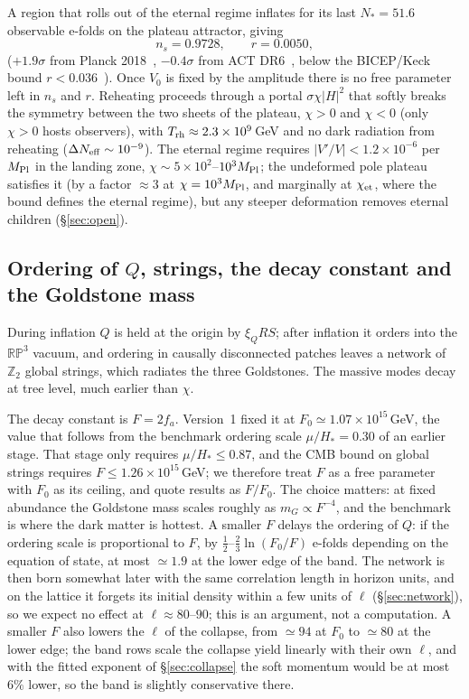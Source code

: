 \documentclass[11pt,a4paper]{article}
\newcommand{\RP}{\mathbb{RP}^3}
\newcommand{\Ztwo}{\mathbb{Z}_2}
\newcommand{\Mpl}{M_{\rm Pl}}
\begin{document}
A region that rolls out of the eternal regime inflates for its last $N_* = 51.6$ observable e-folds on the plateau attractor, giving
\begin{equation}
n_s = 0.9728,\qquad r = 0.0050,
\end{equation}
($+1.9\sigma$ from Planck 2018~\cite{Planck2018X}, $-0.4\sigma$ from ACT DR6~\cite{ACTDR6}, below the BICEP/Keck bound $r<0.036$~\cite{BK18}).
Once $V_0$ is fixed by the amplitude there is no free parameter left in $n_s$ and $r$.
Reheating proceeds through a portal $\sigma\chi|H|^2$ that softly breaks the symmetry between the two sheets of the plateau, $\chi>0$ and $\chi<0$ (only $\chi>0$ hosts observers), with $T_{\rm rh}\approx2.3\times10^{9}$\,GeV and no dark radiation from reheating ($\Delta N_{\rm eff}\sim10^{-9}$).
The eternal regime requires $|V'/V| < 1.2\times10^{-6}$ per $\Mpl$ in the landing zone, $\chi\sim 5\times10^2$--$10^3\Mpl$; the undeformed pole plateau satisfies it (by a factor $\approx3$ at $\chi=10^3\Mpl$, and marginally at $\chi_{\rm et}$, where the bound defines the eternal regime), but any steeper deformation removes eternal children (\S\ref{sec:open}).

\subsection{Ordering of $Q$, strings, the decay constant and the Goldstone mass}
\label{sec:F}

During inflation $Q$ is held at the origin by $\xi_Q R S$; after inflation it orders into the $\RP$ vacuum, and ordering in causally disconnected patches leaves a network of $\Ztwo$ global strings, which radiates the three Goldstones.
The massive modes decay at tree level, much earlier than $\chi$.

The decay constant is $F=2f_a$.
Version~1 fixed it at $F_0\simeq1.07\times10^{15}$\,GeV, the value that follows from the benchmark ordering scale $\mu/H_*=0.30$ of an earlier stage.
That stage only requires $\mu/H_*\le0.87$, and the CMB bound on global strings requires $F\le1.26\times10^{15}$\,GeV; we therefore treat $F$ as a free parameter with $F_0$ as its ceiling, and quote results as $F/F_0$.
The choice matters: at fixed abundance the Goldstone mass scales roughly as $m_G\propto F^{-4}$, and the benchmark is where the dark matter is hottest.
A smaller $F$ delays the ordering of $Q$: if the ordering scale is proportional to $F$, by $\tfrac12$--$\tfrac23\ln(F_0/F)$ e-folds depending on the equation of state, at most $\simeq1.9$ at the lower edge of the band. The network is then born somewhat later with the same correlation length in horizon units, and on the lattice it forgets its initial density within a few units of $\ell$ (\S\ref{sec:network}), so we expect no effect at $\ell\approx80$--$90$; this is an argument, not a computation. A smaller $F$ also lowers the $\ell$ of the collapse, from $\simeq94$ at $F_0$ to $\simeq80$ at the lower edge; the band rows scale the collapse yield linearly with their own $\ell$, and with the fitted exponent of \S\ref{sec:collapse} the soft momentum would be at most $6\%$ lower, so the band is slightly conservative there.
\end{document}
